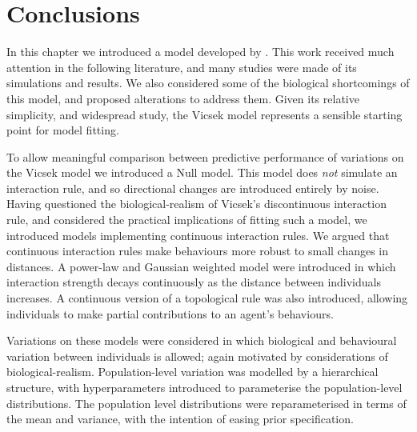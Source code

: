 \section*{Conclusions}

In this chapter we introduced a model developed by \textcite{vicsek95}. This
work received much attention in the following literature, and many studies were
made of its simulations and results. We also considered some of the biological
shortcomings of this model, and proposed alterations to address them. Given its
relative simplicity, and widespread study, the Vicsek model represents a
sensible starting point for model fitting.

To allow meaningful comparison between predictive performance of variations on
the Vicsek model we introduced a Null model. This model does \emph{not}
simulate an interaction rule, and so directional changes are introduced
entirely by noise. Having questioned the biological-realism of Vicsek's
discontinuous interaction rule, and considered the practical implications of
fitting such a model, we introduced models implementing continuous interaction
rules. We argued that continuous interaction rules make behaviours more robust
to small changes in distances. A power-law and Gaussian weighted model were
introduced in which interaction strength decays continuously as the distance
between individuals increases. A continuous version of a topological rule was
also introduced, allowing individuals to make partial contributions to an
agent's behaviours.

Variations on these models were considered in which biological and behavioural
variation between individuals is allowed; again motivated by considerations of
biological-realism. Population-level variation was modelled by a hierarchical
structure, with hyperparameters introduced to parameterise the population-level
distributions. The population level distributions were reparameterised in terms
of the mean and variance, with the intention of easing prior specification.
